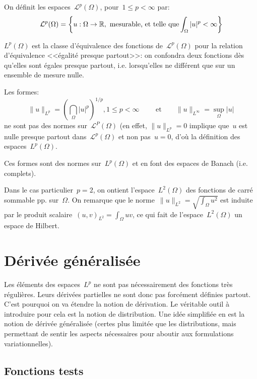 On définit les espaces~$\mathscr{L}^p(\Omega)$, pour~$1\le p<\infty$ par:
\[
\mathcal{L}^p(\Omega)=\left\{u:\Omega\rightarrow\mathbb R, \text{ mesurable, et telle que}
\displaystyle\int_\Omega|u|^p<\infty\right\}
\]

\medskip
$L^p(\Omega)$ est la classe d'équivalence des fonctions de~$\mathscr{L}^ p(\Omega)$ 
pour la relation d'équivalence <<égalité presque partout>>: on confondra deux fonctions 
dès qu'elles sont égales presque partout, i.e. lorsqu'elles ne différent que sur un ensemble
de mesure nulle.

Les formes:
\[
\|u\|_{L^p}=\left(\dint_\Omega |u|^p\right)^{1/p}, 1\le p<\infty \qquad \text{ et}
\qquad \|u\|_{L^\infty}=\sup_\Omega |u|
\]
ne sont pas des normes sur~$\mathscr{L}^P(\Omega)$
(en effet, $\|u\|_{L^p}=0$ implique que~$u$ est nulle presque partout dans~$\mathscr{L}^p(\Omega)$
et non pas~$u = 0$, d'où la définition des espaces~$L^p(\Omega)$.

Ces formes sont des normes sur~$L^p(\Omega)$ et en font des espaces de Banach (i.e. complets).

\medskip
Dans le cas particulier~$p=2$, on ontient l'espace~$L^2(\Omega)$ des fonctions de carré 
sommable pp. sur~$\Omega$. On remarque que le norme~$\|u\|_{L^2}=\sqrt{\int_\Omega u^2}$
est induite par le produit scalaire~$(u,v)_{L^2}=\int_\Omega uv$, ce qui fait de
l'espace~$L^2(\Omega)$ un espace de Hilbert.





\medskip
\section*{Dérivée généralisée}

Les éléments des espaces~$L^p$ ne sont pas nécessairement des fonctions très régulières.
Leurs dérivées partielles ne sont donc pas forcément définies partout.
C'est pourquoi on va étendre la notion de dérivation. 
Le véritable outil à introduire pour cela est la notion de distribution.
Une idée simplifiée en est la notion de dérivée généralisée (certes plus limitée que
les distributions, mais permettant de sentir les aspects nécessaires pour aboutir aux formulations
variationnelles).

\medskip
\subsection*{Fonctions tests}

